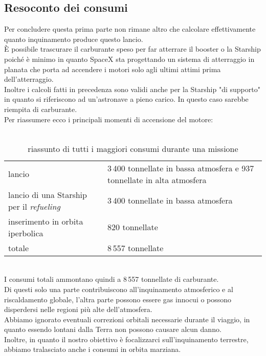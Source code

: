 \subsection{Resoconto dei consumi}
Per concludere questa prima parte non rimane altro che calcolare effettivamente quanto inquinamento produce questo lancio.\\
È possibile trascurare il carburante speso per far atterrare il booster o la Starship poiché è minimo in quanto SpaceX sta progettando un sistema di atterraggio in planata che porta ad accendere i motori solo agli ultimi attimi prima dell'atterraggio.\\
Inoltre i calcoli fatti in precedenza sono validi anche per la Starship "di supporto" in quanto si riferiscono ad un'astronave a pieno carico. In questo caso sarebbe riempita di carburante.\\
Per riassumere ecco i principali momenti di accensione del motore:\\
\\
\begin{table}[h!]
\centering
\label{tablella consumi}

\begin{tabular}{|l|l|}
    \hline
    lancio & 3\,400 tonnellate in bassa atmosfera e 937 tonnellate in alta atmosfera  \\
    lancio di una Starship per il \textit{refueling} & 3\,400 tonnellate in bassa atmosfera  \\
    inserimento in orbita iperbolica & 820 tonnellate \\
    \hline
    totale & 8\,557 tonnellate \\
    \hline
    
\end{tabular}
\caption{riassunto di tutti i maggiori consumi durante una missione}
\end{table}\\
I consumi totali ammontano quindi a 8\,557 tonnellate di carburante.\\ Di questi solo una parte contribuiscono all'inquinamento atmosferico e al riscaldamento globale, l'altra parte possono essere gas innocui o possono disperdersi nelle regioni più alte dell'atmosfera.\\
Abbiamo ignorato eventuali correzioni orbitali necessarie durante il viaggio, in quanto essendo lontani dalla Terra non possono causare alcun danno.\\
Inoltre, in quanto il nostro obiettivo è focalizzarci sull'inquinamento terrestre, abbiamo tralasciato anche i consumi in orbita marziana.
